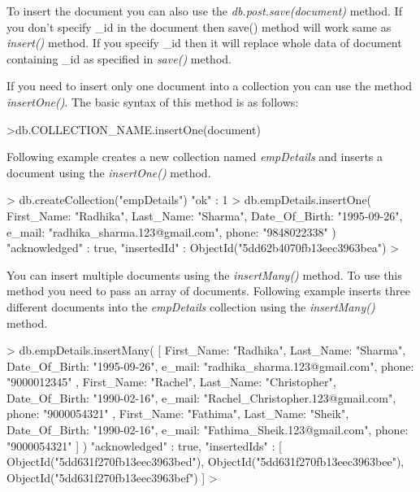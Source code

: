 \documentclass[12pt]{article}
\begin{document}
To insert the document you can also use the
\emph{db.post.save(document)} method. If you don't specify \_id in the
document then save() method will work same as \emph{insert()} method. If
you specify \_id then it will replace whole data of document containing
\_id as specified in \emph{save()} method.

If you need to insert only one document into a collection you can use
the method \emph{insertOne()}.
The basic syntax of this method is as follows:

\begin{bashcode}
>db.COLLECTION_NAME.insertOne(document)
\end{bashcode}

Following example creates a new collection named \emph{empDetails} and
inserts a document using the \emph{insertOne()} method.

\begin{bashcode}
> db.createCollection("empDetails")
{ "ok" : 1 }
> db.empDetails.insertOne(
    {
        First_Name: "Radhika",
        Last_Name: "Sharma",
        Date_Of_Birth: "1995-09-26",
        e_mail: "radhika_sharma.123@gmail.com",
        phone: "9848022338"
    })
{
    "acknowledged" : true,
    "insertedId" : ObjectId("5dd62b4070fb13eec3963bea")
}
>
\end{bashcode}

You can insert multiple documents using the \emph{insertMany()} method.
To use this method you need to pass an array of documents. Following
example inserts three different documents into the \emph{empDetails} collection
using the \emph{insertMany()} method.

\begin{bashcode}
> db.empDetails.insertMany(
    [
        {
            First_Name: "Radhika",
            Last_Name: "Sharma",
            Date_Of_Birth: "1995-09-26",
            e_mail: "radhika_sharma.123@gmail.com",
            phone: "9000012345"
        },
        {
            First_Name: "Rachel",
            Last_Name: "Christopher",
            Date_Of_Birth: "1990-02-16",
            e_mail: "Rachel_Christopher.123@gmail.com",
            phone: "9000054321"
        },
        {
            First_Name: "Fathima",
            Last_Name: "Sheik",
            Date_Of_Birth: "1990-02-16",
            e_mail: "Fathima_Sheik.123@gmail.com",
            phone: "9000054321"
        }
    ]
)
{
    "acknowledged" : true,
    "insertedIds" : [
        ObjectId("5dd631f270fb13eec3963bed"),
        ObjectId("5dd631f270fb13eec3963bee"),
        ObjectId("5dd631f270fb13eec3963bef")
    ]
}
>
\end{bashcode}
\end{document}
